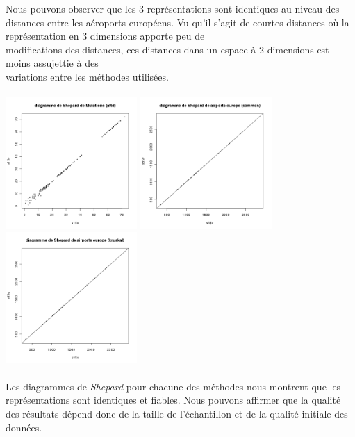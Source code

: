 \documentclass[a4paper, 10pt]{article}
\begin{document}
Nous pouvons observer que les 3 représentations sont identiques au niveau des distances entre les aéroports européens.
Vu qu'il s'agit de courtes distances où la représentation en 3 dimensions apporte peu de\\modifications des distances,
ces distances dans un espace à 2 dimensions est moins assujettie à des\\variations entre les méthodes utilisées.\\ \\
\includegraphics[height = 5cm, width = 5cm]{plots/plot_euro_shepard_cmdscale.png}
\includegraphics[height = 5cm, width = 5cm]{plots/plot_euro_shepard_sammon.png}
\includegraphics[height = 5cm, width = 5cm]{plots/plot_euro_shepard_kruskal.png}\\ \\
Les diagrammes de \textit{Shepard} pour chacune des méthodes nous montrent que les représentations sont identiques et fiables.
Nous pouvons affirmer que la qualité des résultats dépend donc de la taille de l'échantillon et de la qualité initiale des données.
\end{document}
